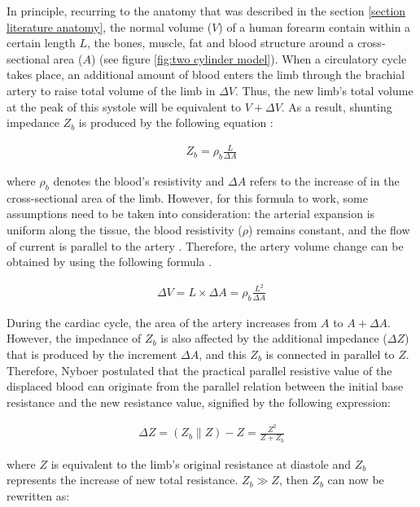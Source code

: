 In principle, recurring to the anatomy that was described in the section \ref{section literature anatomy}, the normal volume ($V$) of a human forearm contain within a certain length $L$, the bones, muscle, fat and blood structure around a cross-sectional area ($A$) (see figure \ref{fig:two cylinder model}). When a circulatory cycle takes place, an additional amount of blood enters the limb through the brachial artery to raise total volume of the limb in $\Delta V$. Thus, the new limb's total volume at the peak of this systole will be equivalent to $V + \Delta V$. As a result, shunting impedance $Z_b$ is produced by the following equation \cite{swanson1976origin, webster2009medical}:

\begin{align}
	\label{eq:blood impedance}
	Z_b = \rho_b \frac{L}{\Delta A}
\end{align}

where $\rho_b$ denotes the blood's resistivity and $\Delta A$ refers to the increase of in the cross-sectional area of the limb. However, for this formula to work, some assumptions need to be taken into consideration: the arterial expansion is uniform along the tissue, the blood resistivity ($\rho$) remains constant, and the flow of current is parallel to the artery \cite{bera2014bioelectrical}. Therefore, the artery volume change can be obtained by using the following formula \cite{swanson1976origin, webster2009medical}.

\begin{align}
	\label{eq:delta volume}
	\Delta V = L \times \Delta A = \rho_b \frac{L^2}{\Delta A}
\end{align}

During the cardiac cycle, the area of the artery increases from $A$ to $A + \Delta A$. However, the impedance of $Z_b$ is also affected by the additional impedance ($\Delta Z$) that is produced by the increment $\Delta A$, and this $Z_b$ is connected in parallel to $Z$. Therefore, Nyboer \cite{nyober1950electrical} postulated that the practical parallel resistive value of the displaced blood can originate from the parallel relation between the initial base resistance and the new resistance value, signified by the following expression:

\begin{align}
	\label{eq:parallel model}
	\Delta Z = (Z_b \parallel Z) - Z = \frac{Z^2}{Z + Z_b}
\end{align}

where $Z$ is equivalent to the limb's original resistance at diastole and $Z_b$ represents the increase of new total resistance. $Z_b \gg Z$, then $Z_b$ can now be rewritten as:

